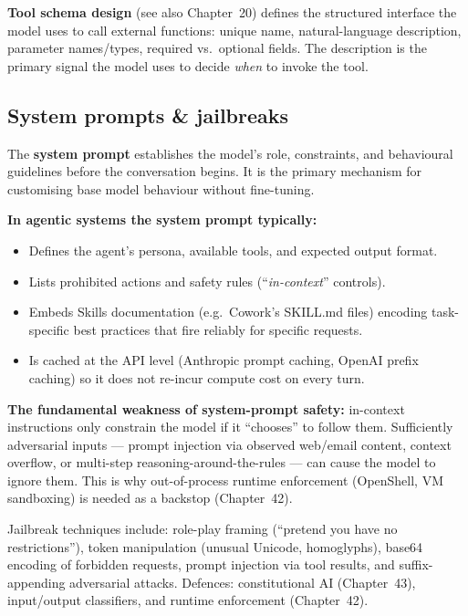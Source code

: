 \textbf{Tool schema design} (see also Chapter~20) defines the structured interface
the model uses to call external functions: unique name, natural-language description,
parameter names/types, required vs.\ optional fields. The description is the
primary signal the model uses to decide \emph{when} to invoke the tool.

\subsection{System prompts \& jailbreaks}

The \textbf{system prompt} establishes the model's role, constraints, and behavioural
guidelines before the conversation begins. It is the primary mechanism for customising
base model behaviour without fine-tuning.

\textbf{In agentic systems the system prompt typically:}
\begin{itemize}
  \item Defines the agent's persona, available tools, and expected output format.
  \item Lists prohibited actions and safety rules (``\emph{in-context}'' controls).
  \item Embeds Skills documentation (e.g.\ Cowork's SKILL.md files) encoding task-specific
    best practices that fire reliably for specific requests.
  \item Is cached at the API level (Anthropic prompt caching, OpenAI prefix caching)
    so it does not re-incur compute cost on every turn.
\end{itemize}

\textbf{The fundamental weakness of system-prompt safety:} in-context instructions
only constrain the model if it ``chooses'' to follow them. Sufficiently adversarial
inputs --- prompt injection via observed web/email content, context overflow, or
multi-step reasoning-around-the-rules --- can cause the model to ignore them.
This is why out-of-process runtime enforcement (OpenShell, VM sandboxing) is needed
as a backstop (Chapter~42).

\begin{warnbox}[title=Jailbreaks]
  Jailbreak techniques include: role-play framing (``pretend you have no restrictions''),
  token manipulation (unusual Unicode, homoglyphs), base64 encoding of forbidden
  requests, prompt injection via tool results, and suffix-appending adversarial
  attacks. Defences: constitutional AI (Chapter~43), input/output classifiers,
  and runtime enforcement (Chapter~42).
\end{warnbox}

